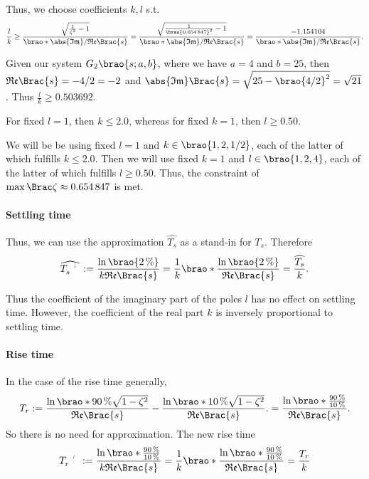 \documentclass[11pt]{article}
\begin{document}
\begin{adjustwidth}{0.5in}{0in}
        Thus, we choose coefficients \(k, l\) s.t.
        \[
            \frac{l}k
            \geq \frac{\sqrt{\frac1{\zeta^2} - 1}}{\brao*{\mathfrak{\abs{Im}/Re}}\Brac{s}}
            = \frac{\sqrt{\frac1{\brao{\num{0.654847}}^2} - 1}}{\brao*{\mathfrak{\abs{Im}/Re}}\Brac{s}}
            = \frac
                {-1.154104}
                {\brao*{\mathfrak{\abs{Im}/Re}}\Brac{s}}.
        \]

        Given our system \(G_2\brao{s; a, b}\), where we have
        \(a = 4\) and \(b = 25\), then \(
            \mathfrak{Re}\Brac{s} = -4/2 = -2
        \) and \(
            \abs{\mathfrak{Im}}\Brac{s} = \sqrt{25 - \brao{4/2}^2} = \sqrt{21}
        \). Thus \(\frac{l}k \geq \num{0.503692}\).

        For fixed \(l = 1\),
        then \(k \leq {2.0}\),
        whereas for fixed \(k = 1\),
        then \(l \geq {0.50}\).

        We will be be using fixed \(l = 1\)
        and \(k \in \brao{1, 2, 1/2}\),
        each of the latter of which fulfills \(k \leq 2.0\).
        Then we will use fixed \(k = 1\)
        and \(l \in \brao{1, 2, 4}\),
        each of the latter of which fulfills \(l \geq 0.50\). Thus, the constraint of \(\max\Brac\zeta \approx \num{0.654847}\) is met.

        \paragraph{Settling time}
        Thus, we can use the approximation \(\widehat{T_s}\) as a stand-in for \(T_s\). Therefore
        \[
            \widehat{\setprime{T}_s}
            := \frac{\ln\brao{\SI2\percent}}{k\mathfrak{Re}\Brac{s}}
            = \frac1k \brao*{\frac{\ln\brao{\SI2\percent}}{\mathfrak{Re}\Brac{s}}}
            = \frac{\widehat{T_s}}k.
        \]

        Thus the coefficient of the imaginary part of the poles \(l\) has no effect on settling time.
        However, the coefficient of the real part \(k\) is inversely proportional to settling time.

        \paragraph{Rise time}
        In the case of the rise time generally,
        \[
            T_r
            :=
                \frac{\ln\brao*{\SI{90}\percent \sqrt{1 - \zeta^2}}}{\mathfrak{Re}\Brac{s}}
                - \frac{\ln\brao*{\SI{10}\percent \sqrt{1 - \zeta^2}}}{\mathfrak{Re}\Brac{s}}.
            = \frac{\ln\brao*{\frac
                {\SI{90}\percent}
                {\SI{10}\percent}
            }}{\mathfrak{Re}\Brac{s}}.
        \]
        So there is no need for approximation. The new rise time
        \[
            \setprime{T}_r
            := \frac{\ln\brao*{\frac
                {\SI{90}\percent}
                {\SI{10}\percent}
            }}{k \mathfrak{Re}\Brac{s}}
            = \frac1k \brao*{\frac{\ln\brao*{\frac
                {\SI{90}\percent}
                {\SI{10}\percent}
            }}{\mathfrak{Re}\Brac{s}}}
            = \frac{T_r}{k}
        \]


\end{adjustwidth}
\end{document}
